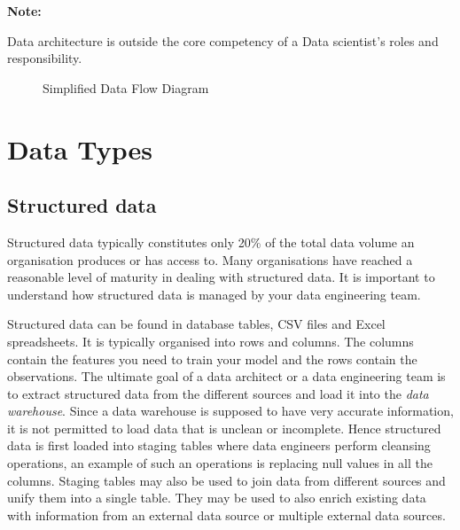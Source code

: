 \documentclass[a4paper, 11pt]{article}
\newenvironment{note}{
    \begin{siderule}
        \textbf{Note: }
        }{
    \end{siderule}}
\begin{document}
    \begin{note}
        Data architecture is outside the core competency of a Data scientist’s roles and responsibility.
    \end{note}

    \begin{figure}[ht]
        \centering
        \caption{Simplified Data Flow Diagram}
        \label{fig:dataflow}
    \end{figure}


    \section{Data Types}

    \subsection{Structured data}

    Structured data typically constitutes only 20\% of the total data volume an organisation produces or has access to.
    Many organisations have reached a reasonable level of maturity in dealing with structured data.
    It is important to understand how structured data is managed by your data engineering team.

    Structured data can be found in database tables, CSV files and Excel spreadsheets.
    It is typically organised into rows and columns.
    The columns contain the features you need to train your model and the rows contain the observations.
    The ultimate goal of a data architect or a data engineering team is to extract structured data from the different sources and load it into the \textit{data warehouse}.
    Since a data warehouse is supposed to have very accurate information, it is not permitted to load data that is unclean or incomplete.
    Hence structured data is first loaded into staging tables where data engineers perform cleansing operations, an example of such an operations is replacing null values in all the columns.
    Staging tables may also be used to join data from different sources and unify them into a single table.
    They may be used to also enrich existing data with information from an external data source or multiple external data sources.
\end{document}
